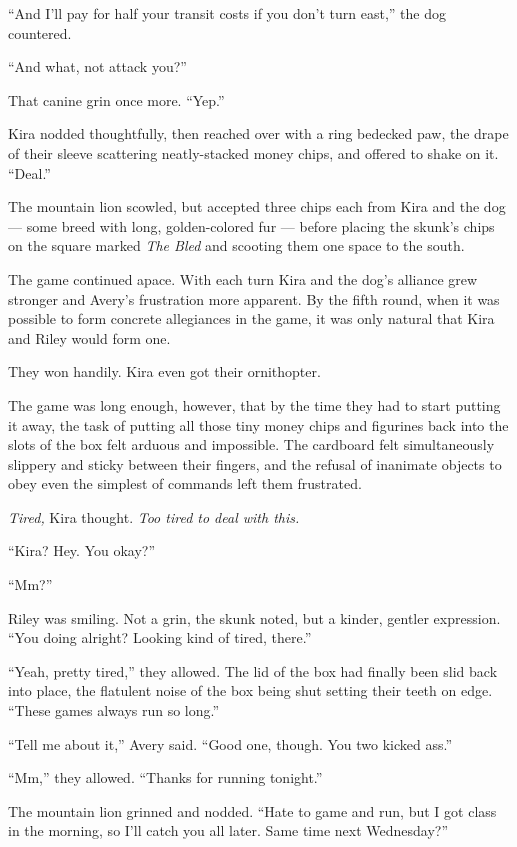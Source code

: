 ``And I'll pay for half your transit costs if you don't turn east,'' the dog countered.

``And what, not attack you?''

That canine grin once more. ``Yep.''

Kira nodded thoughtfully, then reached over with a ring bedecked paw, the drape of their sleeve scattering neatly-stacked money chips, and offered to shake on it. ``Deal.''

The mountain lion scowled, but accepted three chips each from Kira and the dog --- some breed with long, golden-colored fur --- before placing the skunk's chips on the square marked \emph{The Bled} and scooting them one space to the south.

The game continued apace. With each turn Kira and the dog's alliance grew stronger and Avery's frustration more apparent. By the fifth round, when it was possible to form concrete allegiances in the game, it was only natural that Kira and Riley would form one.

They won handily. Kira even got their ornithopter.

The game was long enough, however, that by the time they had to start putting it away, the task of putting all those tiny money chips and figurines back into the slots of the box felt arduous and impossible. The cardboard felt simultaneously slippery and sticky between their fingers, and the refusal of inanimate objects to obey even the simplest of commands left them frustrated.

\emph{Tired,} Kira thought. \emph{Too tired to deal with this.}

``Kira? Hey. You okay?''

``Mm?''

Riley was smiling. Not a grin, the skunk noted, but a kinder, gentler expression. ``You doing alright? Looking kind of tired, there.''

``Yeah, pretty tired,'' they allowed. The lid of the box had finally been slid back into place, the flatulent noise of the box being shut setting their teeth on edge. ``These games always run so long.''

``Tell me about it,'' Avery said. ``Good one, though. You two kicked ass.''

``Mm,'' they allowed. ``Thanks for running tonight.''

The mountain lion grinned and nodded. ``Hate to game and run, but I got class in the morning, so I'll catch you all later. Same time next Wednesday?''

